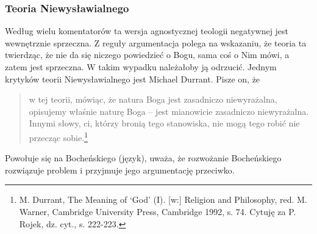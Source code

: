 \subsubsection{Teoria Niewysławialnego}

Według wielu komentatorów ta wersja agnostycznej teologii negatywnej
jest wewnętrznie sprzeczna. Z reguły argumentacja polega na wskazaniu,
że teoria ta twierdząc, że nie da się niczego powiedzieć o Bogu, sama
coś o Nim mówi, a zatem jest sprzeczna. W takim wypadku należałoby ją
odrzucić. Jednym krytyków teorii Niewysławialnego jest Michael Durrant.
Pisze on, że

\begin{quote}
    w tej teorii, mówiąc, że natura Boga jest zasadniczo niewyrażalna,
opisujemy właśnie naturę Boga -- jest mianowicie zasadniczo
niewyrażalna. Innymi słowy, ci, którzy bronią tego stanowiska, nie mogą
tego robić nie przecząc sobie.\footnote{M. Durrant, The Meaning of
‘God’ (I). [w:] Religion and Philosophy, red.  M. Warner, Cambridge
University Press, Cambridge 1992, s. 74. Cytuję za P. Rojek, dz. cyt.,
s. 222-223. }
\end{quote}

Powołuje się na Bocheńskiego (język), uważa, że rozwożanie Bocheńskiego rozwiązuje problem
i przyjmuje jego argumentację przeciwko.

